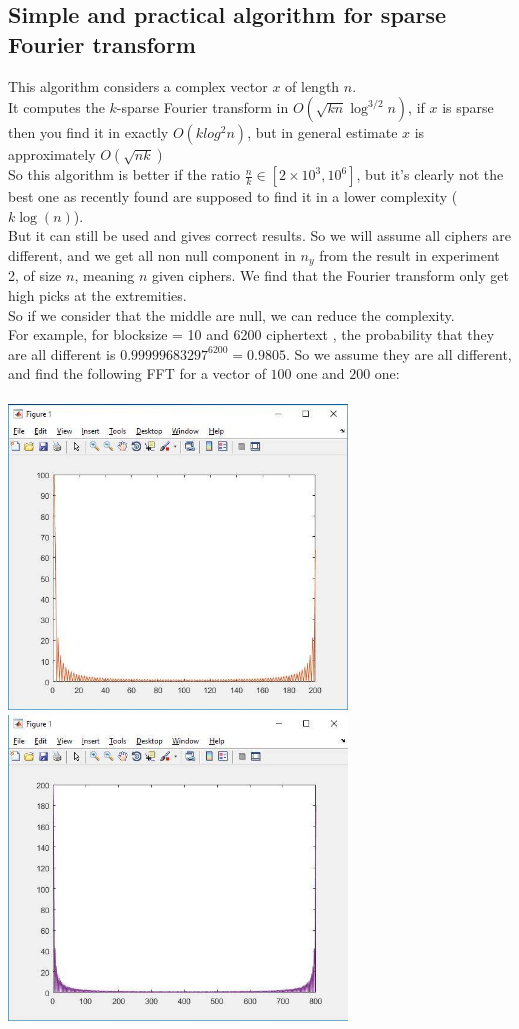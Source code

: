 \documentclass{article}
\begin{document}
\subsection{Simple and practical algorithm for sparse Fourier transform}
This algorithm considers a complex vector $x$ of length $n$.\\
It computes the $k$-sparse Fourier transform in $O(\sqrt{kn}\log^{3/2}n)$, if $x$ is sparse then you find it in exactly $O(klog^{2}n)$, but in general estimate $x$ is approximately $O(\sqrt{nk})$\\
So this algorithm is better if the ratio $\frac{n}{k} \in [2 \times 10^3, 10^6]$, but it's clearly not the best one as recently found are supposed to find it in a lower complexity ($k\log(n)$).\\
But it can still be used and gives correct results.
So we will assume all ciphers are different, and we get all non null component in $n_y$ from the result in experiment 2, of size $n$, meaning $n$ given ciphers. We find that the Fourier transform only get high picks at the extremities.\\
So if we consider that the middle are null, we can reduce the complexity.\\
For example, for blocksize = 10 and 6200 ciphertext , the probability that they are all different is $0.99999683297^{6200} = 0.9805$. So we assume they are all different, and find the following FFT for a vector of $100$ one and $200$ one:\\
\\
\includegraphics[width=90mm]{FFT100ones.jpg}
\includegraphics[width=90mm]{FFT200ones.jpg}
\end{document}
